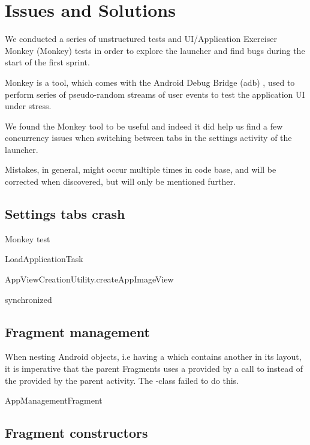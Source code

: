 
\section{Issues and Solutions}

We conducted a series of unstructured tests and UI/Application Exerciser Monkey (Monkey) \parencite{android_monkey} tests in order to explore the launcher and find bugs during the start of the first sprint. 

Monkey is a tool, which comes with the Android Debug Bridge (adb) \parencite{android_adb}, used to perform series of pseudo-random streams of user events to test the application UI under stress.

We found the Monkey tool to be useful and indeed it did help us find a few concurrency issues when switching between tabs in the settings activity of the launcher.

Mistakes, in general, might occur multiple times in code base, and will be corrected when discovered, but will only be  mentioned further.



\subsection{Settings tabs crash}



Monkey test

LoadApplicationTask

AppViewCreationUtility.createAppImageView

synchronized

\subsection{Fragment management}

When nesting Android  objects, i.e having a  which contains another  in its layout, it is imperative that the parent Fragments uses a  provided by a call to  instead of the  provided by the parent activity. The \giraf-class  failed to do this.   

AppManagementFragment




\subsection{Fragment constructors}

